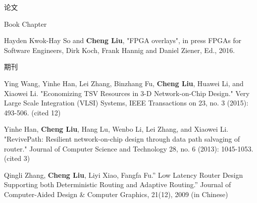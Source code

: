 \documentclass{resume} %
\begin{document}
\begin{rSection}{论文}
    \begin{rSubsection} {Book Chapter}{}{}{}
    \item Hayden Kwok-Hay So and \textbf{Cheng Liu}, "FPGA overlays", in press FPGAs for Software
        Engineers, Dirk Koch, Frank Hannig and Daniel Ziener, Ed., 2016.  
    \end{rSubsection}

    \begin{rSubsection} {期刊}{}{}{}
    \item Ying Wang, Yinhe Han, Lei Zhang, Binzhang Fu, \textbf{Cheng Liu}, Huawei Li, and Xiaowei Li.
        "Economizing TSV Resources in 3-D Network-on-Chip Design." Very Large Scale Integration
        (VLSI) Systems, IEEE Transactions on 23, no. 3 (2015): 493-506. (cited 12)  
    \item Yinhe Han, \textbf{Cheng Liu}, Hang Lu, Wenbo Li, Lei Zhang, and Xiaowei Li. "RevivePath:
        Resilient network-on-chip design through data path salvaging of router." Journal of Computer
        Science and Technology 28, no. 6 (2013): 1045-1053. (cited 3)
    \item Qingli Zhang, \textbf{Cheng Liu}, Liyi Xiao, Fangfa Fu.” Low Latency Router Design Supporting both
        Deterministic Routing and Adaptive Routing.” Journal of Computer-Aided Design \& Computer
        Graphics, 21(12), 2009 (in Chinese)
    \end{rSubsection}


\end{rSection}
\end{document}
